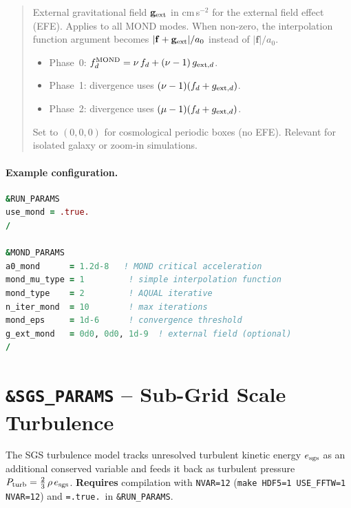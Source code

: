 \begin{quote}
External gravitational field $\mathbf{g}_{\rm ext}$ in cm\,s$^{-2}$
for the external field effect (EFE).  Applies to all MOND modes.
When non-zero, the interpolation function argument becomes
$|\mathbf{f} + \mathbf{g}_{\rm ext}|/a_0$ instead of
$|\mathbf{f}|/a_0$.

\begin{itemize}
\item Phase~0: $f_d^{\rm MOND} = \nu\,f_d + (\nu-1)\,g_{{\rm ext},d}$.
\item Phase~1: divergence uses $(\nu-1)(f_d + g_{{\rm ext},d})$.
\item Phase~2: divergence uses $(\mu-1)(f_d + g_{{\rm ext},d})$.
\end{itemize}

Set to $(0,0,0)$ for cosmological periodic boxes (no EFE).
Relevant for isolated galaxy or zoom-in simulations.
\end{quote}

\paragraph{Example configuration.}
\begin{lstlisting}[language=Fortran]
&RUN_PARAMS
use_mond = .true.
/

&MOND_PARAMS
a0_mond      = 1.2d-8   ! MOND critical acceleration
mond_mu_type = 1         ! simple interpolation function
mond_type    = 2         ! AQUAL iterative
n_iter_mond  = 10        ! max iterations
mond_eps     = 1d-6      ! convergence threshold
g_ext_mond   = 0d0, 0d0, 1d-9  ! external field (optional)
/
\end{lstlisting}


\section{\texttt{\&SGS\_PARAMS} -- Sub-Grid Scale Turbulence}
\label{sec:sgs_params}

The SGS turbulence model tracks unresolved turbulent kinetic energy
$e_{\rm sgs}$ as an additional conserved variable and feeds it back as
turbulent pressure $P_{\rm turb} = \tfrac{2}{3}\,\rho\,e_{\rm sgs}$.
\textbf{Requires} compilation with \texttt{NVAR=12}
(\texttt{make HDF5=1 USE\_FFTW=1 NVAR=12}) and 
\texttt{=.true.}\ in \texttt{\&RUN\_PARAMS}.

